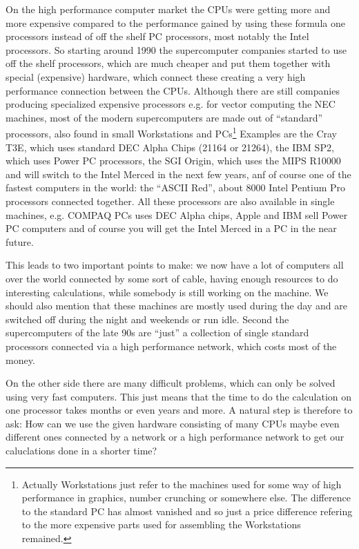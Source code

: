 On the high performance computer market the CPUs were getting more and more 
expensive compared to the performance gained by using these formula one
processors instead of off the shelf PC processors, most notably the
Intel processors. So starting around 1990 the supercomputer companies
started to use off the shelf processors, which are much cheaper and
put them together with special (expensive) hardware, which connect
these creating a very high performance connection between
the CPUs. Although there are still companies producing specialized expensive
processors e.g. for vector computing the NEC machines, most of
the modern supercomputers are made out of ``standard'' processors,
also found in small Workstations and PCs\footnote{Actually Workstations 
just refer to the machines used for some way of high performance
in graphics, number crunching or somewhere else. The difference to
the standard PC has almost vanished and so just a price
difference refering to the more  expensive parts used for 
assembling the Workstations remained.} 
Examples are the Cray T3E, which uses standard DEC Alpha Chips 
(21164 or 21264), the IBM SP2, which uses Power PC processors, the 
SGI Origin, which uses the MIPS R10000 and will switch to the 
Intel Merced in  the next few years, anf of course one of the fastest
computers in the world: the ``ASCII Red'', about 8000 Intel Pentium Pro
processors connected together.
All these processors are
also available in single machines, e.g. COMPAQ PCs uses DEC Alpha
chips, Apple and IBM sell Power PC computers and of course you
will get the Intel Merced in a PC in the near future. 

This leads to two important points to make: we now have a lot of
computers all over the world connected by some sort of cable,
having enough resources to do 
interesting calculations, while somebody is still working on the
machine. We should also mention that these machines are mostly used
during the day and are switched off during the night and weekends
or run idle. Second the supercomputers of the late 90s are ``just'' 
a collection of single standard processors connected via a high
performance network, which costs most of the money. 

On the other side there are many difficult problems, which can
only be solved using very fast computers. This just means that
the time to do the calculation on one processor takes months or
even years and more. A natural step 
is therefore to ask: How can we use the given hardware consisting
of many CPUs maybe even different ones connected by a network or
a high performance network to get our caluclations done in a
shorter time?

